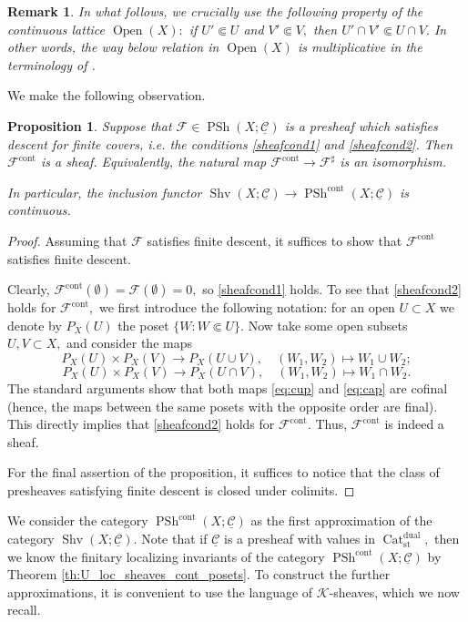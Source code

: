 \documentclass[11pt,leqno]{amsart}
\newtheorem{prop}[theo]{Proposition}
\newtheorem{remark}[theo]{Remark}
\numberwithin{equation}{section}
\newcommand{\ms}[1]{\mathscr{#1}}
\newcommand{\msK}{\ms{K}}
\newcommand{\Cat}{\operatorname{Cat}}
\newcommand{\cont}{\operatorname{cont}}
\newcommand{\st}{\operatorname{st}}
\newcommand{\dual}{\operatorname{dual}}
\newcommand{\cF}{{\mathcal F}}
\newcommand{\cC}{{\mathcal C}}
\newcommand{\un}{\underline}
\newcommand{\PSh}{\operatorname{PSh}}
\newcommand{\Sh}{\operatorname{Shv}}
\newcommand{\Open}{\operatorname{Open}}
\begin{document}
\begin{remark}
In what follows, we crucially use the following property of the continuous lattice $\Open(X):$ if $U'\Subset U$ and $V'\Subset V,$ then $U'\cap V'\Subset U\cap V.$ In other words, the way below relation in $\Open(X)$ is multiplicative in the terminology of \cite{GHKLMS}. 
\end{remark}

We make the following observation.



\begin{prop}Suppose that $\cF\in\PSh(X;\un{\cC})$ is a presheaf which satisfies descent for finite covers, i.e. the conditions \ref{sheafcond1} and \ref{sheafcond2}. Then $\cF^{\cont}$ is a sheaf. Equivalently, the natural map $\cF^{\cont}\to\cF^{\sharp}$ is an isomorphism.

In particular, the inclusion functor $\Sh(X;\un{\cC})\to \PSh^{\cont}(X;\un{\cC})$ is continuous.\end{prop}

\begin{proof} Assuming that $\cF$ satisfies finite descent, it suffices to show that $\cF^{\cont}$ satisfies finite descent.

Clearly, $\cF^{\cont}(\emptyset)=\cF(\emptyset)=0,$ so \ref{sheafcond1} holds. To see that \ref{sheafcond2} holds for $\cF^{\cont},$ we first introduce the following notation: for an open $U\subset X$ we denote by $P_X(U)$ the poset $\{W:W\Subset U\}.$ Now take some open subsets $U,V\subset X,$ and consider the maps
\begin{equation}\label{eq:cup} P_X(U)\times P_X(V)\to P_X(U\cup V),\quad (W_1,W_2)\mapsto W_1\cup W_2;\end{equation}
\begin{equation}\label{eq:cap} P_X(U)\times P_X(V)\to P_X(U\cap V),\quad (W_1,W_2)\mapsto W_1\cap W_2.\end{equation}
The standard arguments show that both maps \eqref{eq:cup} and \eqref{eq:cap} are cofinal (hence, the maps between the same posets with the opposite order are final). This directly implies that \ref{sheafcond2} holds for $\cF^{\cont}.$ Thus, $\cF^{\cont}$ is indeed a sheaf.

For the final assertion of the proposition, it suffices to notice that the class of presheaves satisfying finite descent is closed under colimits.   
\end{proof}

We consider the category $\PSh^{\cont}(X;\un{\cC})$ as the first approximation of the category $\Sh(X;\un{\cC}).$ Note that if $\un{\cC}$ is a presheaf with values in $\Cat_{\st}^{\dual},$ then we know the finitary localizing invariants of the category $\PSh^{\cont}(X;\un{\cC})$ by Theorem \ref{th:U_loc_sheaves_cont_posets}. To construct the further approximations, it is convenient to use the language of $\msK$-sheaves, which we now recall.
\end{document}
